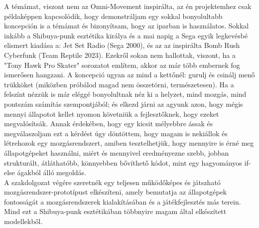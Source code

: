 A témámat, viszont nem az Omni-Movement inspirálta, az én projektemhez csak példaképpen kapcsolódik, hogy demonstráljam egy sokkal bonyolultabb koncepción is a témámat és bizonyítsam, hogy az iparban is használa\-tos. Sokkal inkább a Shibuya-punk esztétika \cite{Yoko2023} királya és a mai napig a Sega egyik legkevésbé elismert kiadása a: Jet Set Radio (Sega 2000), és az az inspirálta Bomb Rush Cyberfunk (Team Reptile 2023). Ezekről sokan nem hallottak, viszont, ha a "Tony Hawk Pro Skater" sorozatot említem, akkor az már több embernek fog ismerősen hangzani. A koncepció ugyan az mind a kettőnél: gurulj és csinálj menő trükköket (miközben próbálod magad nem összetörni, természetesen). Ha a felszínt nézzük is már eléggé bonyolultnak néz ki a helyzet, mind mozgás, mind pontszám számítás szempontjából; és elkezd  járni az agyunk azon, hogy mégis mennyi állapotot kellet nyomon követniük a fejlesztőknek, hogy ezeket megvalósítsák. Annak érdekében, hogy egy kicsit mélyebbre ássak és megválaszoljam ezt a kérdést úgy döntöttem, hogy magam is nekiállok és létrehozok egy mozgásrendszert, amiben tesztelhetjük, hogy mennyire is érné meg állapotgépeket használni, miért és mennyivel eredményezne szebb, jobban strukturált, átláthatóbb, könnyebben bővíthető kódot, mint egy hagyományos if-else ágakból álló megol\-dás.\\

A szakdolgozat végére szeretnék egy teljesen működőképes és játszható mozgásrendszer-prototípust elkészíteni, amely bemutatja az állapotgépek fon\-tosságát a mozgásrendszerek kialakításában és a játékfejlesztés más terein. Mind ezt a Shibuya-punk esztétikában többnyire magam által elkészített modellekből.\\
